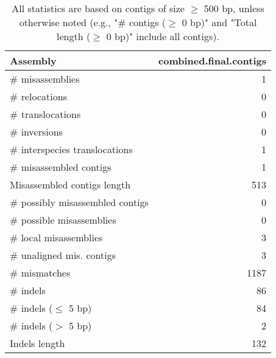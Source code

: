 \documentclass[12pt,a4paper]{article}
\begin{document}
\begin{table}[ht]
\begin{center}
\caption{All statistics are based on contigs of size $\geq$ 500 bp, unless otherwise noted (e.g., "\# contigs ($\geq$ 0 bp)" and "Total length ($\geq$ 0 bp)" include all contigs).}
\begin{tabular}{|l*{1}{|r}|}
\hline
Assembly & combined.final.contigs \\ \hline
\# misassemblies & 1 \\ \hline
\hspace{5mm}\# relocations & 0 \\ \hline
\hspace{5mm}\# translocations & 0 \\ \hline
\hspace{5mm}\# inversions & 0 \\ \hline
\hspace{5mm}\# interspecies translocations & 1 \\ \hline
\# misassembled contigs & 1 \\ \hline
Misassembled contigs length & 513 \\ \hline
\# possibly misassembled contigs & 0 \\ \hline
\hspace{5mm}\# possible misassemblies & 0 \\ \hline
\# local misassemblies & 3 \\ \hline
\# unaligned mis. contigs & 3 \\ \hline
\# mismatches & 1187 \\ \hline
\# indels & 86 \\ \hline
\hspace{5mm}\# indels ($\leq$ 5 bp) & 84 \\ \hline
\hspace{5mm}\# indels ($>$ 5 bp) & 2 \\ \hline
Indels length & 132 \\ \hline
\end{tabular}
\end{center}
\end{table}
\end{document}
